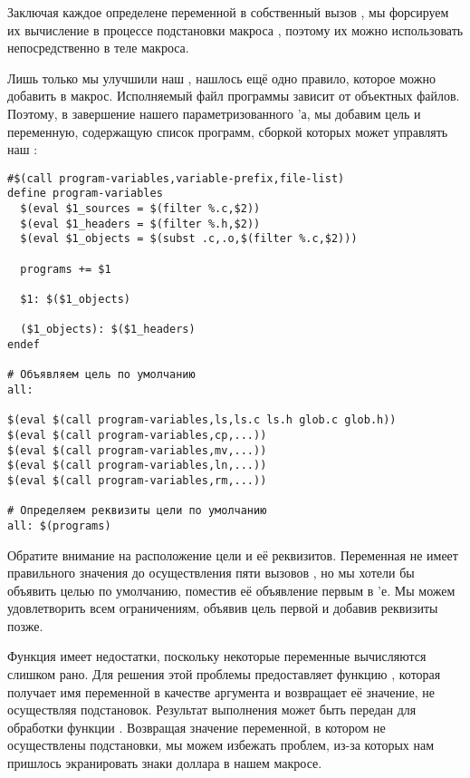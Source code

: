 Заключая каждое определене переменной в собственный вызов
, мы форсируем их вычисление в процессе подстановки
макроса , поэтому их можно использовать
непосредственно в теле макроса.

Лишь только мы улучшили наш \Makefile{}, нашлось ещё одно правило,
которое можно добавить в макрос. Исполняемый файл программы зависит от
объектных файлов. Поэтому, в завершение нашего параметризованного
\Makefile{}'а, мы добавим цель  и переменную, содержащую
список программ, сборкой которых может управлять наш \Makefile{}:

{\footnotesize
\begin{verbatim}
#$(call program-variables,variable-prefix,file-list)
define program-variables
  $(eval $1_sources = $(filter %.c,$2))
  $(eval $1_headers = $(filter %.h,$2))
  $(eval $1_objects = $(subst .c,.o,$(filter %.c,$2)))
  
  programs += $1

  $1: $($1_objects)

  ($1_objects): $($1_headers)
endef

# Объявляем цель по умолчанию
all:

$(eval $(call program-variables,ls,ls.c ls.h glob.c glob.h))
$(eval $(call program-variables,cp,...))
$(eval $(call program-variables,mv,...))
$(eval $(call program-variables,ln,...))
$(eval $(call program-variables,rm,...))

# Определяем реквизиты цели по умолчанию
all: $(programs)
\end{verbatim}
}

Обратите внимание на расположение цели  и её реквизитов.
Переменная  не имеет правильного значения до
осуществления пяти вызовов , но мы хотели бы объявить
 целью по умолчанию, поместив её объявление первым в
\Makefile{}'е. Мы можем удовлетворить всем ограничениям, объявив цель
 первой и добавив реквизиты позже.

Функция  имеет недостатки, поскольку
некоторые переменные вычисляются слишком рано. Для решения этой
проблемы \GNUmake{} предоставляет функцию , которая
получает имя переменной в качестве аргумента и возвращает её значение,
не осуществляя подстановок. Результат выполнения 
может быть передан для обработки функции . Возвращая
значение переменной, в котором не осуществлены подстановки, мы можем
избежать проблем, из-за которых нам пришлось экранировать знаки
доллара в нашем макросе.

